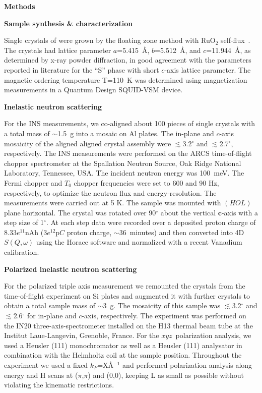 
\vspace{20 pt}
\noindent
{\bf Methods}

\vspace{10 pt}
\noindent
{\bf Sample synthesis \& characterization}

\noindent
%
Single crystals of \CRO were grown by the floating zone method with RuO$_{2}$
self-flux~\cite{Nakatsuji97,Cao97}. The crystals had lattice parameter
$a$=5.415~\r{A}, $b$=5.512~\r{A}, and $c$=11.944~\r{A}, as determined by x-ray
powder diffraction, in good agreement with the parameters reported in
literature\cite{Braden_1998} for the ``S'' phase with short $c$-axis lattice parameter.
The magnetic ordering temperature T=110~K was determined using magnetization
measurements in a Quantum Design SQUID-VSM device.

\vspace{10 pt}
\noindent
{\bf Inelastic neutron scattering}

\noindent
%
For the INS measurements, we co-aligned about 100 pieces of single crystals
with a total mass of $\sim$1.5~g into a mosaic on Al plates. The in-plane and
$c$-axis mosaicity of the aligned aligned crystal assembly were
$\lesssim$3.2$^\circ$ and  $\lesssim$2.7$^\circ$, respectively. The INS
measurements were performed on the ARCS time-of-flight chopper spectrometer at
the Spallation Neutron Source, Oak Ridge National Laboratory, Tennessee, USA.
The incident neutron energy was 100~meV. The Fermi chopper and  $T_{0}$ chopper
frequencies were set to 600 and 90 Hz, respectively, to optimize the neutron
flux and energy-resolution. The measurements were carried out at 5 K. The
sample was mounted with $(HOL)$ plane horizontal. The crystal was rotated over
90$^\circ$  about the vertical $\mathbf{c}$-axis with a step size of 1$^\circ$.
At each step data were recorded over a deposited proton charge of $8.33
e^{11}$nAh ($3 e^{12}$p$C$ proton charge, $\sim 36$~minutes)
and then converted into 4D $S(Q,\omega)$ using the Horace software\cite{horace}
and normalized with a recent Vanadium calibration.

\vspace{10 pt}
\noindent
{\bf Polarized inelastic neutron scattering}

\noindent
%
For the polarized triple axis measurement we remounted the crystals from the
time-of-flight experiment on Si plates and augmented it with further crystals
to obtain a total sample mass of $\sim$3~g.
%
The mosaicity of this sample was $\lesssim$3.2$^\circ$ and 
$\lesssim$2.6$^\circ$ for in-plane and $c$-axis, respectively.
%
The experiment was performed on the IN20 three-axis-spectrometer installed on
the H13 thermal beam tube at the Institut Laue-Langevin, Grenoble, France. For
the $xyz$~polarization analysis, we used a Heusler (111) monochromator as well
as a Heusler (111) analysator in combination with the Helmholtz coil at the
sample position.
%
Throughout the experiment we used a fixed $k_F$=X\r{A}$^{-1}$ and performed
polarization analysis along energy and H scans at ($\pi$,$\pi$) and (0,0),
keeping L as small as possible without violating the kinematic restrictions.



